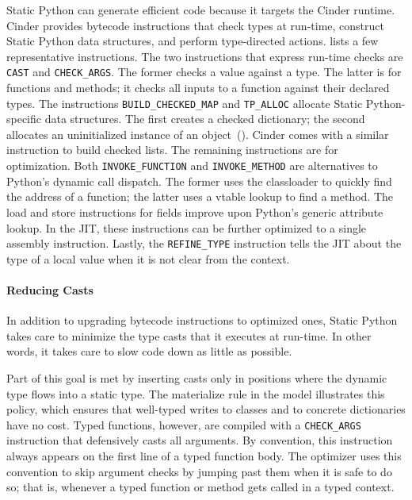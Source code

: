 \documentclass[english,cleveref,crc]{programming}
\newcommand{\SP}{Static Python}
\newcommand{\code}[1]{\texttt{#1}}
\newcommand{\bcinst}[1]{\code{#1}}
\begin{document}
\SP{} can generate efficient code because it targets
the Cinder runtime.
Cinder provides bytecode instructions that check types at run-time,
construct \SP{} data structures, and perform type-directed actions.
 lists a few representative instructions.
The two instructions that express run-time checks are \bcinst{CAST}
and \bcinst{CHECK\_ARGS}.
The former checks a value against a type.
The latter is for functions and methods; it checks all inputs to a function
against their declared types.
The instructions \bcinst{BUILD\_CHECKED\_MAP} and \bcinst{TP\_ALLOC}
allocate \SP{}-specific data structures.
The first creates a checked dictionary; the second allocates an uninitialized instance
of an object~().
Cinder comes with a similar instruction to build checked lists.
The remaining instructions are for optimization.
Both \bcinst{INVOKE\_FUNCTION} and \bcinst{INVOKE\_METHOD} are alternatives
to Python's dynamic call dispatch.
The former uses the classloader to quickly find the address of a function;
the latter uses a vtable lookup to find a method.
The load and store instructions for fields improve upon Python's generic attribute lookup.
In the JIT, these instructions can be further optimized to a single assembly instruction.
Lastly, the \bcinst{REFINE\_TYPE} instruction tells the JIT about the type of a local value
when it is not clear from the context.


\paragraph{Reducing Casts}

In addition to upgrading bytecode instructions to optimized ones, \SP{} takes care
to minimize the type casts that it executes at run-time.
In other words, it takes care to slow code down as little as possible.

Part of this goal is met by inserting casts only in positions where the dynamic
type flows into a static type.
The materialize rule in the model illustrates this policy, which ensures that
well-typed writes to classes and to concrete dictionaries have no cost.
Typed functions, however, are compiled with a \bcinst{CHECK\_ARGS} instruction
that defensively casts all arguments.
By convention, this instruction always appears on the first line of a typed
function body.
The optimizer uses this convention to skip argument checks by jumping past them
when it is safe to do so; that is, whenever a typed function or method gets
called in a typed context.
\end{document}
